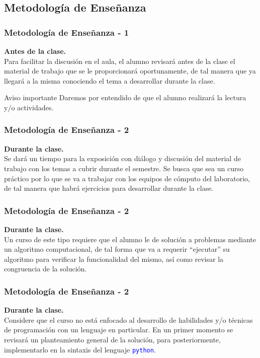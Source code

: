 \subsection{Metodología de Enseñanza}
\begin{frame}
\frametitle{Metodología de Enseñanza - 1}
\textbf{Antes de la clase.}
\\
\vspace{0.5em}
Para facilitar la discusión en el aula, el alumno revisará antes de la clase el material de trabajo que se le proporcionará oportunamente, de tal manera que ya llegará a la misma conociendo el tema a desarrollar durante la clase.
\\
\bigskip
\pause
\begin{alertblock}{Aviso importante}
Daremos por entendido de que el alumno realizará la lectura y/o actividades.
\end{alertblock}
\end{frame}
\begin{frame} 
\frametitle{Metodología de Enseñanza - 2}
\textbf{Durante la clase.}
\\
\vspace{0.5em}
Se dará un tiempo para la exposición con diálogo y discusión del material de trabajo con los temas a cubrir durante el semestre. Se busca que sea un curso práctico por lo que se va a trabajar con los equipos de cómputo del laboratorio, de tal manera que habrá ejercicios para desarrollar durante la clase.
\end{frame}
\begin{frame} 
\frametitle{Metodología de Enseñanza - 2}
\textbf{Durante la clase.}
\\
\vspace{0.5em}
Un curso de este tipo requiere que el alumno le de solución a problemas mediante un algoritmo computacional, de tal forma que va a requerir \enquote{ejecutar} su algoritmo para verificar la funcionalidad del mismo, así como revisar la congruencia de la solución.
\end{frame}
\begin{frame} 
\frametitle{Metodología de Enseñanza - 2}
\textbf{Durante la clase.}
\\
\medskip
Considere que el curso no está enfocado al desarrollo de habilidades y/o técnicas de programación con un lenguaje en particular. En un primer momento se revisará un planteamiento general de la solución, para posteriormente, implementarlo en la sintaxis del lenguaje \textcolor{blue}{\texttt{python}}.
\end{frame}
